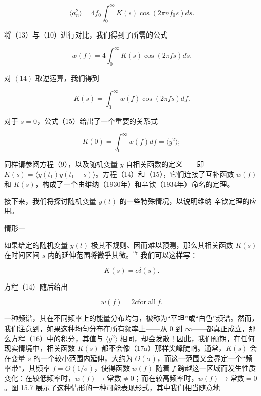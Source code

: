 \begin{equation}\tag{15.4.33}\label{eq:15.4.33}
\langle a _ { n } ^{2} \rangle = 4 f _ { 0 } \int _ { 0 } ^{\infty} K ( s ) \cos ( 2 \pi n f _ { 0 } s ) d s .
\end{equation}

将（13）与（10）进行对比，我们得到了所需的公式

\begin{equation}\tag{15.4.34}\label{eq:15.4.34}
w ( f ) = 4 \int _ { 0 } ^{\infty} K ( s ) \cos ( 2 \pi f s ) d s .
\end{equation}

对 \((14)\) 取逆运算，我们得到

\begin{equation}\tag{15.4.35}\label{eq:15.4.35}
K ( s ) = \int _ { 0 } ^{\infty} w ( f ) \cos ( 2 \pi f s ) d f .
\end{equation}

对于 \(s=0\)，公式（15）给出了一个重要的关系式

\begin{equation}\tag{15.4.36}\label{eq:15.4.36}
K ( 0 ) = \int _ { 0 } ^{\infty} w ( f ) d f = \langle y ^{2} \rangle ;
\end{equation}

同样请参阅方程（9），以及随机变量 \(y\) 自相关函数的定义------即 \(K(s) = \langle y(t_1)y(t_1 + s) \rangle\)。方程（14）和（15），它们连接了互补函数 \(w(f)\) 和 \(K(s)\)，构成了一个由维纳（1930年）和辛钦（1934年）命名的定理。

接下来，我们将探讨随机变量 \(y(t)\) 的一些特殊情况，以说明维纳-辛钦定理的应用。

情形一

如果给定的随机变量 \(y(t)\) 极其不规则、因而难以预测，那么其相关函数 \(K(s)\) 在时间区间 \(s\) 内的延伸范围将微乎其微。\(^{17}\) 我们可以这样写：

\begin{equation}\tag{15.4.37}\label{eq:15.4.37}
K ( s ) = c \delta ( s ) .
\end{equation}

方程（14）随后给出

\begin{equation}\tag{15.4.38}\label{eq:15.4.38}
w ( f ) = 2 c  { \mathrm { f o r ~ a l l ~ } } f .
\end{equation}

一种频谱，其在不同频率上的能量分布均匀，被称为``平坦''或``白色''频谱。然而，我们注意到，如果这种均匀分布在所有频率上------从 0 到 \(\infty\)------都真正成立，那么方程（16）中的积分，其值与 \(\langle y^2 \rangle\) 相同，却会发散！因此，我们预期，在任何现实情境中，相关函数 \(K(s)\) 都不会像（17a）那样尖峰陡峭。通常，\(K(s)\) 会在变量 \(s\) 的一个较小范围内延伸，大约为 \(O(\sigma)\)，而这一范围又会界定一个``频率带''，其频率 \(f = O(1/\sigma)\)，使得函数 \(w(f)\) 随着 \(f\) 跨越这一区域而发生性质变化：在较低频率时，\(w(f) \to \text{常数} \neq 0\)；而在较高频率时，\(w(f) \to \text{常数} = 0\)。图 15.7 展示了这种情形的一种可能表现形式，其中我们相当随意地

